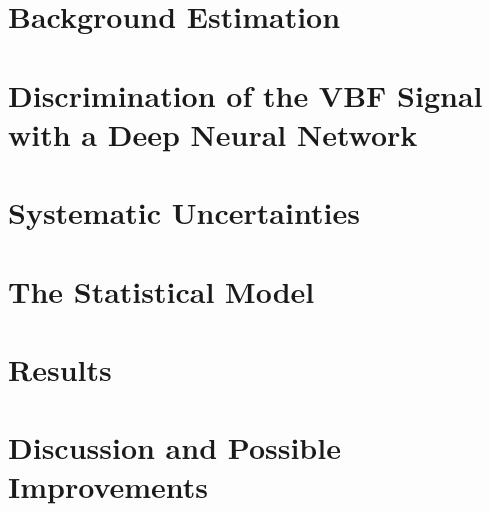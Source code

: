 \section{Background Estimation}
\label{sec:bkg-estimation}


\section{Discrimination of the VBF Signal with a Deep Neural Network}
\label{sec:dnn}


\FloatBarrier
\section{Systematic Uncertainties}
\label{sec:systematics}



\section{The Statistical Model}
\label{sec:stats-analysis}


\FloatBarrier
\section{Results}
\label{sec:hww-results}


\FloatBarrier
\section{Discussion and Possible Improvements}
\label{sec:hww:summary}

